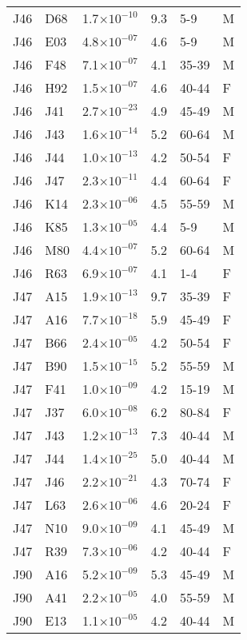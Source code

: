 \begin{longtable}{lllrll}
   J46 & D68 & 1.7$\times10^{-10}$ & 9.3 & 5-9 & M \\ 
   J46 & E03 & 4.8$\times10^{-07}$ & 4.6 & 5-9 & M \\ 
   J46 & F48 & 7.1$\times10^{-07}$ & 4.1 & 35-39 & M \\ 
   J46 & H92 & 1.5$\times10^{-07}$ & 4.6 & 40-44 & F \\ 
   J46 & J41 & 2.7$\times10^{-23}$ & 4.9 & 45-49 & M \\ 
   J46 & J43 & 1.6$\times10^{-14}$ & 5.2 & 60-64 & M \\ 
   J46 & J44 & 1.0$\times10^{-13}$ & 4.2 & 50-54 & F \\ 
   J46 & J47 & 2.3$\times10^{-11}$ & 4.4 & 60-64 & F \\ 
   J46 & K14 & 2.3$\times10^{-06}$ & 4.5 & 55-59 & M \\ 
   J46 & K85 & 1.3$\times10^{-05}$ & 4.4 & 5-9 & M \\ 
   J46 & M80 & 4.4$\times10^{-07}$ & 5.2 & 60-64 & M \\ 
   J46 & R63 & 6.9$\times10^{-07}$ & 4.1 & 1-4 & F \\ 
   J47 & A15 & 1.9$\times10^{-13}$ & 9.7 & 35-39 & F \\ 
   J47 & A16 & 7.7$\times10^{-18}$ & 5.9 & 45-49 & F \\ 
   J47 & B66 & 2.4$\times10^{-05}$ & 4.2 & 50-54 & F \\ 
   J47 & B90 & 1.5$\times10^{-15}$ & 5.2 & 55-59 & M \\ 
   J47 & F41 & 1.0$\times10^{-09}$ & 4.2 & 15-19 & M \\ 
   J47 & J37 & 6.0$\times10^{-08}$ & 6.2 & 80-84 & F \\ 
   J47 & J43 & 1.2$\times10^{-13}$ & 7.3 & 40-44 & M \\ 
   J47 & J44 & 1.4$\times10^{-25}$ & 5.0 & 40-44 & M \\ 
   J47 & J46 & 2.2$\times10^{-21}$ & 4.3 & 70-74 & F \\ 
   J47 & L63 & 2.6$\times10^{-06}$ & 4.6 & 20-24 & F \\ 
   J47 & N10 & 9.0$\times10^{-09}$ & 4.1 & 45-49 & M \\ 
   J47 & R39 & 7.3$\times10^{-06}$ & 4.2 & 40-44 & F \\ 
   J90 & A16 & 5.2$\times10^{-09}$ & 5.3 & 45-49 & M \\ 
   J90 & A41 & 2.2$\times10^{-05}$ & 4.0 & 55-59 & M \\ 
   J90 & E13 & 1.1$\times10^{-05}$ & 4.2 & 40-44 & M \\ 

\end{longtable}
